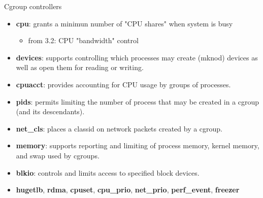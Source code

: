 \documentclass[
  english,          
  aspectratio=169,    %
]{tumbeamer}
\begin{document}
\begin{frame}{Cgroup controllers}
\begin{itemize}
    \item \textbf{cpu}: grants a minimun number of "CPU shares" when system is busy
    \begin{itemize}
        \item \small from 3.2: CPU "bandwidth" control 
    \end{itemize}
    \item \textbf{devices}: supports controlling which processes may create (mknod) devices as well as open them for reading or writing.
    \item \textbf{cpuacct}: provides accounting for CPU usage by groups of processes.
    \item \textbf{pids}: permits limiting the number of process that may be created in a cgroup (and its descendants).
    \item \textbf{net\_cls}: places a classid on network packets created by a cgroup.  
    \item \textbf{memory}: supports reporting and limiting of process memory, kernel memory, and swap used by cgroups.
    \item \textbf{blkio}: controls and limits access to specified block devices.
    \item \textbf{hugetlb}, \textbf{rdma}, \textbf{cpuset}, \textbf{cpu\_prio}, \textbf{net\_prio}, \textbf{perf\_event}, \textbf{freezer}
    
\end{itemize}
\end{frame}
\end{document}
